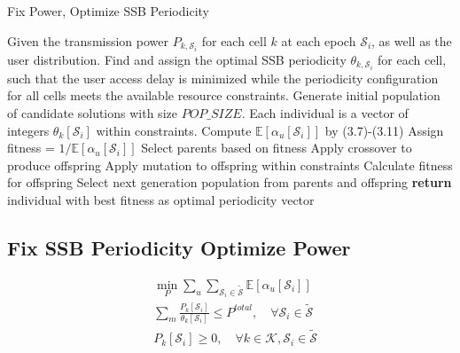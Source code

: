\begin{algorithm}[H]
    \caption{Fix Power, Optimize SSB Periodicity}
    \label{alg:FPOS}
    \begin{algorithmic}[1]
        \REQUIRE{}
        Given the transmission power $P_{k, \mathcal{S}_i}$ for each cell $k$ at each epoch $\mathcal{S}_i$, as well as the user distribution.
        \ENSURE
        Find and assign the optimal SSB periodicity $\theta_{k,\mathcal{S}_i}$ for each cell, such that the user access delay is minimized while the periodicity configuration for all cells meets the available resource constraints.
        \STATE Generate initial population of candidate solutions with size $POP\_SIZE$.
        \STATE Each individual is a vector of integers $\theta_k[\mathcal{S}_i]$ within constraints. 
                \STATE Compute $\mathbb{E}[\alpha_u[\mathcal{S}_i]]$ by (3.7)-(3.11)
                \STATE Assign fitness = $1 / \mathbb{E}[\alpha_u[\mathcal{S}_i]]$
            \ENDFOR
            \STATE Select parents based on fitness
            \STATE Apply crossover to produce offspring
            \STATE Apply mutation to offspring within constraints
            \STATE Calculate fitness for offspring
            \STATE Select next generation population from parents and offspring
        \ENDFOR
        \STATE \textbf{return} individual with best fitness as optimal periodicity vector
    \end{algorithmic}
\end{algorithm}

\subsection{Fix SSB Periodicity Optimize Power}

\begin{subequations}
\begin{align}
    &\min_{P} \sum_{u} \sum_{\mathcal{S}_i\in \mathcal{\widetilde{S}}} \mathbb{E}[\alpha_u[\mathcal{S}_i]] \\
    &\sum_{m} \frac{P_{k}[\mathcal{S}_i]}{\theta_k[\mathcal{S}_i]} \leq P^{total}, \quad \forall \mathcal{S}_i \in \mathcal{\widetilde{S}}  \\ 
    &P_k[\mathcal{S}_i]\geq 0, \quad \forall k\in\mathcal{K}, \mathcal{S}_i\in\mathcal{\widetilde{S}}
\end{align}
\end{subequations}

